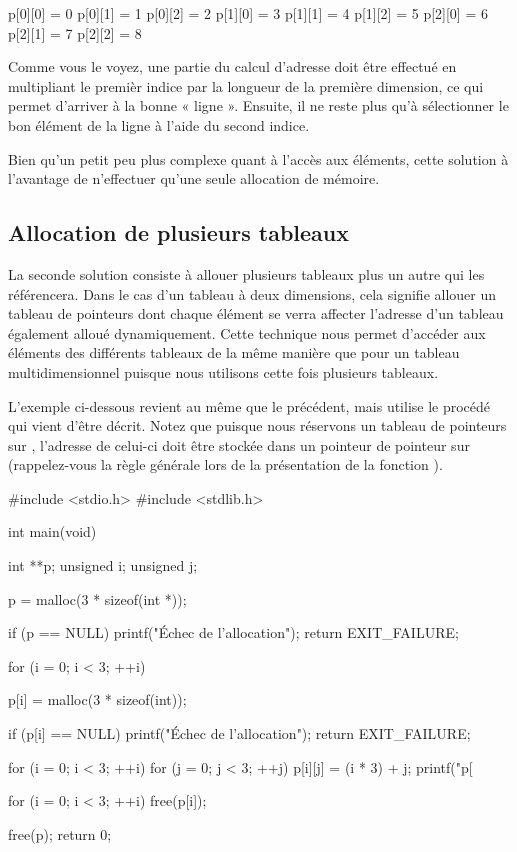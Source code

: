 \begin{C}
p[0][0] = 0
p[0][1] = 1
p[0][2] = 2
p[1][0] = 3
p[1][1] = 4
p[1][2] = 5
p[2][0] = 6
p[2][1] = 7
p[2][2] = 8
\end{C}

Comme vous le voyez, une partie du calcul d'adresse doit être effectué
en multipliant le premièr indice par la longueur de la première
dimension, ce qui permet d'arriver à la bonne « ligne ». Ensuite, il ne
reste plus qu'à sélectionner le bon élément de la ligne à l'aide du
second indice.

Bien qu'un petit peu plus complexe quant à l'accès aux éléments, cette
solution à l'avantage de n'effectuer qu'une seule allocation de mémoire.

\subsection{Allocation de plusieurs tableaux}
\label{allocation-de-plusieurs-tableaux}

La seconde solution consiste à allouer plusieurs tableaux plus un autre
qui les référencera. Dans le cas d'un tableau à deux dimensions, cela
signifie allouer un tableau de pointeurs dont chaque élément se verra
affecter l'adresse d'un tableau également alloué dynamiquement. Cette
technique nous permet d'accéder aux éléments des différents tableaux de
la même manière que pour un tableau multidimensionnel puisque nous
utilisons cette fois plusieurs tableaux.

L'exemple ci-dessous revient au même que le précédent, mais utilise le
procédé qui vient d'être décrit. Notez que puisque nous réservons un
tableau de pointeurs sur , l'adresse de celui-ci doit être
stockée dans un pointeur de pointeur sur  (rappelez-vous la
règle générale lors de la présentation de la fonction
).

\begin{C}
#include <stdio.h>
#include <stdlib.h>


int main(void)
{
    int **p;
    unsigned i;
    unsigned j;

    p = malloc(3 * sizeof(int *));

    if (p == NULL)
    {
        printf("Échec de l'allocation\n");
        return EXIT_FAILURE;
    }

    for (i = 0; i < 3; ++i)
    {
        p[i] = malloc(3 * sizeof(int));

        if (p[i] == NULL)
        {
            printf("Échec de l'allocation\n");
            return EXIT_FAILURE;
        }
    }

    for (i = 0; i < 3; ++i)
        for (j = 0; j < 3; ++j)
        {
            p[i][j] = (i * 3) + j;
            printf("p[%
        }

    for (i = 0; i < 3; ++i)
        free(p[i]);

    free(p);
    return 0;
}
\end{C}

